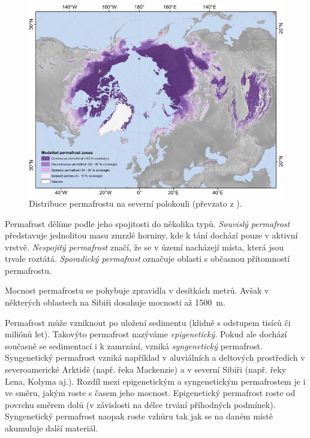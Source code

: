 \begin{figure}[h]
	\centering
	\includegraphics[width=1\linewidth]{obrazky/periglac/permafrost_distr}
	\caption{Distribuce permafrostu na severní polokouli (převzato z \textcite{obuNorthernHemispherePermafrost2019}).}
	\label{fig:permafrostdistr}
\end{figure}

Permafrost dělíme podle jeho spojitosti do několika typů. \emph{Souvislý permafrost} představuje jednolitou masu zmrzlé horniny, kde k tání dochází pouze v aktivní vrstvě. \emph{Nespojitý permafrost} značí, že se v území nacházejí místa, která jsou trvale roztátá. \emph{Sporadický permafrost} označuje oblasti s občasnou přítomností permafrostu. 

Mocnost permafrostu se pohybuje zpravidla v desítkách metrů. Avšak v některých oblastech na Sibiři dosahuje mocnosti až \SI{1500}{\metre}. 

Permafrost může vzniknout po uložení sedimentu (klidně s odstupem tisíců či miliónů let). Takovýto permafrost nazýváme \emph{epigenetický}. Pokud ale dochází současně se sedimentací i k zamrzání, vzniká \emph{syngenetický} permafrost. Syngenetický permafrost vzniká například v aluviálních a deltových prostředích v severoamerické Arktidě (např. řeka Mackenzie) a v severní Sibiři (např. řeky Lena, Kolyma aj.). Rozdíl mezi epigenetickým a syngenetickým permafrostem je i ve směru, jakým roste s časem jeho mocnost. Epigenetický permafrost roste od povrchu směrem dolů (v závislosti na délce trvání příhodných podmínek). Syngenetický permafrost naopak roste vzhůru tak jak se na daném místě akumuluje další materiál.

